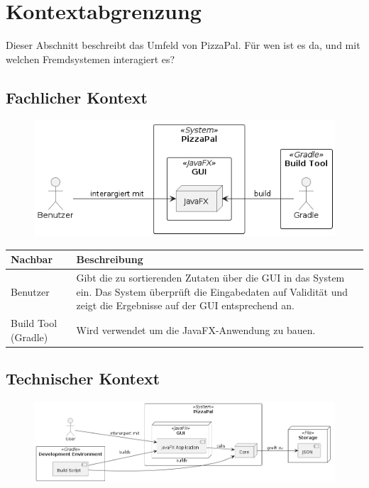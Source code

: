 \section{Kontextabgrenzung}

Dieser Abschnitt beschreibt das Umfeld von PizzaPal. Für wen ist es da, und mit welchen Fremdsystemen interagiert es?

\subsection{Fachlicher Kontext}

\begin{figure}[H]
    \includegraphics[width=\linewidth]{./images/kontextabgrenzung/kontextabgrenzung.png}
    \label{fig:fachKontext}
\end{figure}

\begin{longtable}{|m{}|m{}|}
    \hline
    \textbf{Nachbar} & \textbf{Beschreibung}\\
    \hline
    Benutzer & Gibt die zu sortierenden Zutaten über die GUI in das System ein. Das System überprüft die Eingabedaten auf Validität und zeigt die Ergebnisse auf der GUI entsprechend an.\\
    \hline
    Build Tool (Gradle) & Wird verwendet um die JavaFX-Anwendung zu bauen.\\
    \hline
\end{longtable}

\newpage
\subsection{Technischer Kontext}

\begin{figure}[H]
    \includegraphics[width=\linewidth]{./images/kontextabgrenzung/kontextabgrenzungTech.png}
    \label{fig:techKontext}
\end{figure}

